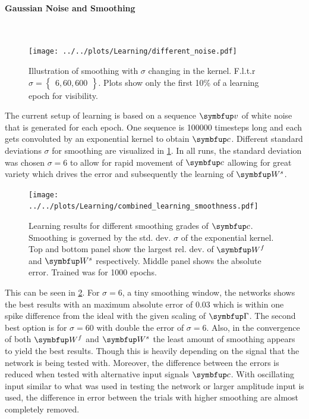 \paragraph{Gaussian Noise and Smoothing}\mbox{}\\
\begin{figure}
	\centering
	\texttt{[image: ../../plots/Learning/different\_noise.pdf]}
	\caption{Illustration of smoothing with $\sigma$ changing in the kernel. F.l.t.r $\sigma = \begin{Bmatrix}
		6,60,600\end{Bmatrix}$. Plots show only the first 10\% of a learning epoch for visibility.}
	\label{fig:generate_input_seq}
\end{figure}
The current setup of learning is based on a sequence $\bmu{v}$ of white noise that is generated for each epoch. One sequence is 100000 timesteps long and each gets convoluted by an exponential kernel to obtain $\bmu{c}$. Different standard deviations $\sigma$ for smoothing are visualized in \cref{fig:generate_input_seq}. In all runs, the standard deviation was chosen $\sigma = 6$ to allow for rapid movement of $\bmu{c}$ allowing for great variety which drives the error and subsequently the learning of $\bmu{W}^s$.\\
\begin{figure}
	\centering
	\texttt{[image: ../../plots/Learning/combined\_learning\_smoothness.pdf]}
	\caption{Learning results for different smoothing grades of $\bmu{c}$. Smoothing is governed by the std. dev. $\sigma$ of the exponential kernel. Top and bottom panel show the largest rel. dev. of $\bmu{W}^f$ and $\bmu{W}^s$ respectively. Middle panel shows the absolute error. Trained was for 1000 epochs.}
	\label{fig:combined_learning_smoothness}
\end{figure}
This can be seen in \cref{fig:combined_learning_smoothness}. For $\sigma = 6$, a tiny smoothing window, the networks shows the best results with an maximum absolute error of $0.03$ which is within one spike difference from the ideal with the given scaling of $\bmu{\Gamma}$. The second best option is for $\sigma = 60$ with double the error of $\sigma = 6$. Also, in the convergence of both $\bmu{W}^f$ and $\bmu{W}^s$ the least amount of smoothing appears to yield the best results. Though this is heavily depending on the signal that the network is being tested with.
Moreover, the difference between the errors is reduced when tested with alternative input signals $\bmu{c}$. With oscillating input similar to what was used in testing the network or larger amplitude input is used, the difference in error between the trials with higher smoothing are almost completely removed.

